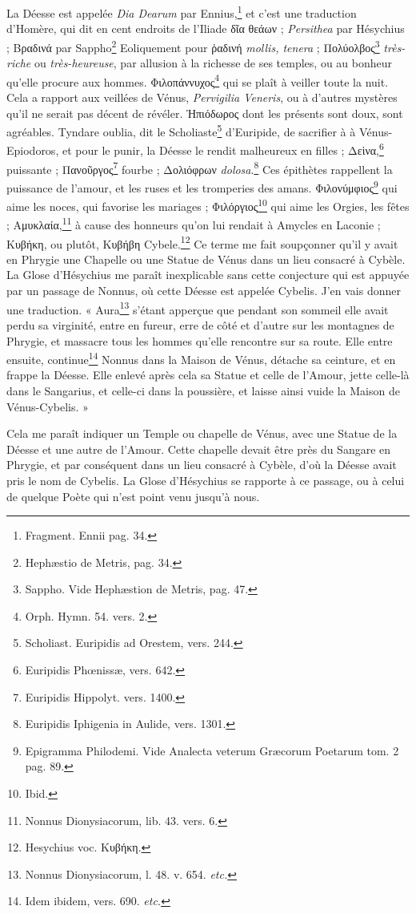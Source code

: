 \documentclass[a4paper, 18pt, oneside]{article}
\begin{document}
La Déesse est appelée \emph{Dia Dearum} par Ennius,\footnote{Fragment. Ennii pag. 34.} et c'est une traduction d'Homère, qui dit en cent endroits de l'Iliade δῖα θεάων ; \emph{Persithea} par Hésychius ; Βραδινά par Sappho\footnote{Hephæstio de Metris, pag. 34.} Eoliquement pour ῥαδινή \emph{mollis, tenera} ; Πολύολβος\footnote{Sappho. Vide Hephæstion de Metris, pag. 47.} \emph{très-riche} ou \emph{très-heureuse}, par allusion à la richesse de ses temples, ou au bonheur qu'elle procure aux hommes. Φιλοπάννυχος\footnote{Orph. Hymn. 54. vers. 2.} qui se plaît à veiller toute la nuit. Cela a rapport aux veillées de Vénus, \emph{Pervigilia Veneris}, ou à d'autres mystères qu'il ne serait pas décent de révéler. Ἠπιόδωρος dont les présents sont doux, sont agréables. Tyndare oublia, dit le Scholiaste\footnote{Scholiast. Euripidis ad Orestem, vers. 244.} d'Euripide, de sacrifier à à Vénus-Epiodoros, et pour le punir, la Déesse le rendit malheureux en filles ; Δεὶνα,\footnote{Euripidis Phœnissæ, vers. 642.} puissante ; Πανοῦργος\footnote{Euripidis Hippolyt. vers. 1400.} fourbe ; Δολιόφρων \emph{dolosa}.\footnote{Euripidis Iphigenia in Aulide, vers. 1301.} Ces épithètes rappellent la puissance de l'amour, et les ruses et les tromperies des amans. Φιλονύμφιος\footnote{Epigramma Philodemi. Vide Analecta veterum Græcorum Poetarum tom. 2 pag. 89.} qui aime les noces, qui favorise les mariages ; Φιλόργιος\footnote{Ibid.} qui aime les Orgies, les fêtes ; Αμυκλαία,\footnote{Nonnus Dionysiacorum, lib. 43. vers. 6.} à cause des honneurs qu'on lui rendait à Amycles en Laconie ; Κυβήκη, ou plutôt, Κυβήβη Cybele.\footnote{Hesychius voc. Κυβήκη.} Ce terme me fait soupçonner qu'il y avait en Phrygie une Chapelle ou une Statue de Vénus dans un lieu consacré à Cybèle. La Glose d'Hésychius me paraît inexplicable sans cette conjecture qui est appuyée par un passage de Nonnus, où cette Déesse est appelée Cybelis. J'en vais donner une traduction. « Aura\footnote{Nonnus Dionysiacorum, l. 48. v. 654. \emph{etc.}} s'étant apperçue que pendant son sommeil elle avait perdu sa virginité, entre en fureur, erre de côté et d'autre sur les montagnes de Phrygie, et massacre tous les hommes qu'elle rencontre sur sa route. Elle entre ensuite, continue\footnote{Idem ibidem, vers. 690. \emph{etc.}} Nonnus dans la Maison de Vénus, détache sa ceinture, et en frappe la Déesse. Elle enlevé après cela sa Statue et celle de l'Amour, jette celle-là dans le Sangarius, et celle-ci dans la poussière, et laisse ainsi vuide la Maison de Vénus-Cybelis. »

Cela me paraît indiquer un Temple ou chapelle de Vénus, avec une Statue de la Déesse et une autre de l'Amour. Cette chapelle devait être près du Sangare en Phrygie, et par conséquent dans un lieu consacré à Cybèle, d'où la Déesse avait pris le nom de Cybelis. La Glose d'Hésychius se rapporte à ce passage, ou à celui de quelque Poète qui n'est point venu jusqu'à nous.
\end{document}
